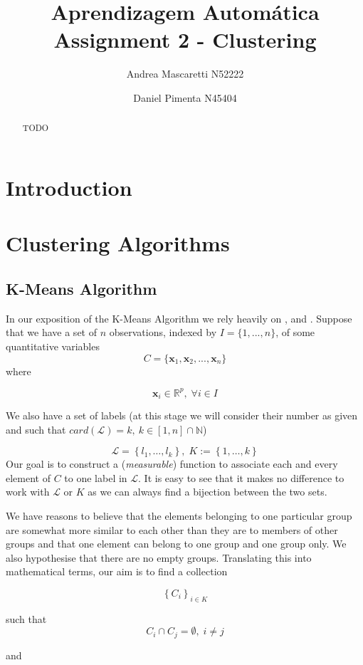 \documentclass[a4paper]{article}
\title{\textbf{Aprendizagem Autom\'{a}tica} \\
	\large Assignment 2 - Clustering}
\author{Andrea Mascaretti N52222\and Daniel Pimenta N45404}
\begin{document}
	\maketitle
	\begin{abstract}
		TODO
	\end{abstract}


	\section{Introduction}
	\section{Clustering Algorithms}
	\subsection{K-Means Algorithm}
	In our exposition of the K-Means Algorithm we rely heavily on \cite{hastie01statisticallearning}, \cite{MR2372475} and \cite{zaki2014dataminingbook}.
	Suppose that we have a set of $n$ observations, indexed by $I = \{1, ..., n\}$, of some quantitative
	variables
	$$ C = \{ \boldsymbol{x}_{1}, \boldsymbol{x}_{2}, ..., \boldsymbol{x}_{n} \} $$
	where
	
	$$ \boldsymbol{x}_{i} \in \mathbb{R}^{p},\;\forall i\in I$$
	
	
	We also have a set of labels (at this stage we will consider their
	number as given and such that $card(\mathcal{L})=k,\:k\in\left[1,n\right]\cap\mathbb{N}$)
	
	$$
	\mathcal{L}=\left\{ l_{1},\ldots,l_{k}\right\} ,\;K:=\left\{ 1,\ldots,k\right\} 
	$$
	Our goal is to construct a (\textit{measurable}) function to associate each
	and every element of $C$ to one label in $\mathcal{L}$. It is easy
	to see that it makes no difference to work with $\mathcal{L}$ or
	$K$ as we can always find a bijection between the two sets.
	
	We have reasons to believe that the elements belonging to one particular
	group are somewhat more similar to each other than they are to members
	of other groups and that one element can belong to one group and one
	group only. We also hypothesise that there are no empty groups. Translating
	this into mathematical terms, our aim is to find a collection
	
	$$ 	\left\{ C_{i}\right\} _{i\in K}	$$
	
	such that
	$$ C_{i}\cap C_{j}=\emptyset,\;i\neq j $$
	
	and
	
\end{document}
